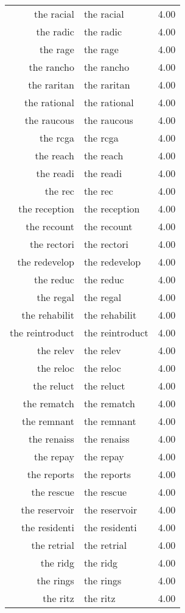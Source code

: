 \begin{table}[ht]
\begin{tabular}{rlr}
  the racial & the racial & 4.00 \\ 
  the radic & the radic & 4.00 \\ 
  the rage & the rage & 4.00 \\ 
  the rancho & the rancho & 4.00 \\ 
  the raritan & the raritan & 4.00 \\ 
  the rational & the rational & 4.00 \\ 
  the raucous & the raucous & 4.00 \\ 
  the rcga & the rcga & 4.00 \\ 
  the reach & the reach & 4.00 \\ 
  the readi & the readi & 4.00 \\ 
  the rec & the rec & 4.00 \\ 
  the reception & the reception & 4.00 \\ 
  the recount & the recount & 4.00 \\ 
  the rectori & the rectori & 4.00 \\ 
  the redevelop & the redevelop & 4.00 \\ 
  the reduc & the reduc & 4.00 \\ 
  the regal & the regal & 4.00 \\ 
  the rehabilit & the rehabilit & 4.00 \\ 
  the reintroduct & the reintroduct & 4.00 \\ 
  the relev & the relev & 4.00 \\ 
  the reloc & the reloc & 4.00 \\ 
  the reluct & the reluct & 4.00 \\ 
  the rematch & the rematch & 4.00 \\ 
  the remnant & the remnant & 4.00 \\ 
  the renaiss & the renaiss & 4.00 \\ 
  the repay & the repay & 4.00 \\ 
  the reports & the reports & 4.00 \\ 
  the rescue & the rescue & 4.00 \\ 
  the reservoir & the reservoir & 4.00 \\ 
  the residenti & the residenti & 4.00 \\ 
  the retrial & the retrial & 4.00 \\ 
  the ridg & the ridg & 4.00 \\ 
  the rings & the rings & 4.00 \\ 
  the ritz & the ritz & 4.00 \\ 

\end{tabular}
\end{table}
